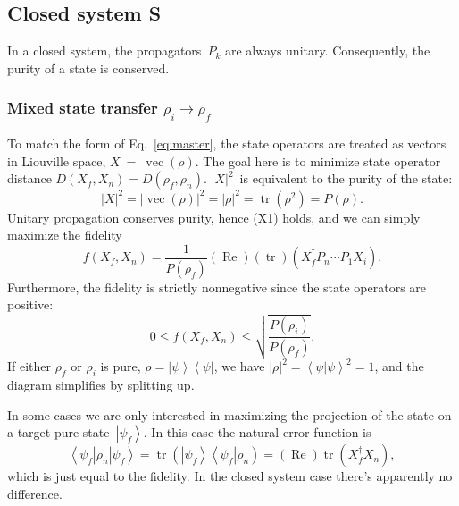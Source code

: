 \documentclass[aps, pra, a4paper, longbibliography]{revtex4}
\newcommand{\be}{\begin{equation}}
\newcommand{\ee}{\end{equation}}
\newcommand{\ket}[1]{\left| #1 \right \rangle}
\newcommand{\bra}[1]{\left \langle #1 \right|}
\newcommand{\braket}[2]{\left \langle #1 | #2 \right \rangle}
\newcommand{\ketbra}[2]{\left| #1 \right \rangle \left \langle #2 \right|}
\DeclareMathOperator{\tr}{tr}
\DeclareMathOperator{\re}{Re}
\DeclareMathOperator{\cvec}{vec}
\newcommand{\dd}[2]{\frac{\partial #1}{\partial #2}}
\begin{document}



\subsection{Closed system S}

In a closed system, the propagators~$P_k$ are always
unitary. Consequently, the purity of a state is conserved.


\subsubsection{Mixed state transfer $\rho_i \to \rho_f$}
\label{sec:closed-mixed}

To match the form of Eq.~\eqref{eq:master},
the state operators are treated as vectors in Liouville space, $X~=~\cvec(\rho)$.
The goal here is to minimize state operator distance
$D(X_f, X_n) = D(\rho_f, \rho_n)$.
$|X|^2$~is equivalent to the purity of the state:
\be
|X|^2
= |\cvec(\rho)|^2
= |\rho|^2
= \tr(\rho^2)
= P(\rho).
\ee
Unitary propagation conserves purity, hence (X1) holds, and we can
simply maximize the fidelity
\be
f(X_f, X_n)
= \frac{1}{P(\rho_f)} (\re) (\tr) \left( X_f^\dagger  P_n \cdots P_1 X_i \right).
\ee
Furthermore, the fidelity is strictly nonnegative since the
state operators are positive:
\be
0 \le f(X_f, X_n) \le \sqrt{\frac{P(\rho_i)}{P(\rho_f)}}.
\ee
If either $\rho_f$ or $\rho_i$ is pure,
$\rho = \ketbra{\psi}{\psi}$,
we have $|\rho|^2 = \braket{\psi}{\psi}^2 = 1$, and
the diagram simplifies by splitting up.


In some cases we are only interested in maximizing the projection of
the state on a target pure state~$\ket{\psi_f}$. In this case the natural error
function is
\be
\bra{\psi_f} \rho_n \ket{\psi_f}
= \tr\left(\ketbra{\psi_f}{\psi_f} \rho_n \right)
= (\re) \tr\left(X_f^\dagger X_n\right),
\ee
which is just equal to the fidelity. In the closed system case there's
apparently no difference.
\end{document}
